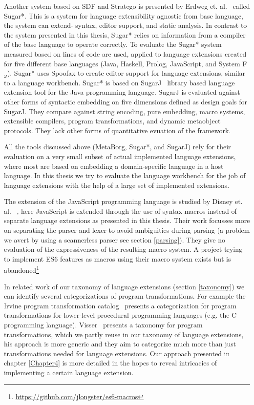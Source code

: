 Another system based on SDF and Stratego is presented by Erdweg et. al.~\cite{Erdweg} called Sugar*. This is a system for language extensibility agnostic from base language, the system can extend- syntax, editor support, and static analysis. In contrast to the system presented in this thesis, Sugar* relies on information from a compiler of the base language to operate correctly. To evaluate the Sugar* system measured based on lines of code are used, applied to language extensions created for five different base languages (Java, Haskell, Prolog, JavaScript, and System F$_{\omega}$). Sugar* uses Spoofax to create editor support for language extensions, similar to a language workbench. Sugar* is based on SugarJ~\cite{Erdweg2011} library based language extension tool for the Java programming language. SugarJ is evaluated against other forms of syntactic embedding on five dimensions defined as design goals for SugarJ. They compare against string encoding, pure embedding, macro systems, extensible compilers, program transformations, and dynamic metaobject protocols. They lack other forms of quantitative evuation of the framework.

All the tools discussed above (MetaBorg, Sugar*, and SugarJ) rely for their evaluation on a very small subset of actual implemented language extensions, where most are based on embedding a domain-specific language in a host language. In this thesis we try to evaluate the language workbench for the job of language extensions with the help of a large set of implemented extensions.  

The extension of the JavaScript programming language is studied by Disney et. al. ~\cite{Disney2014}, here JavaScript is extended through the use of syntax macros instead of separate language extensions as presented in this thesis. Their work focusses more on separating the parser and lexer to avoid ambiguities during parsing (a problem we avert by using a scannerless parser see section \ref{parsing}). They give no evaluation of the expressiveness of the resulting macro system. A project trying to implement ES6 features as macros using their macro system exists but is abandoned\footnote{\url{https://github.com/jlongster/es6-macros}}

In related work of our taxonomy of language extensions (section \ref{taxonomy}) we can identify several categorizations of program transformations. For example the Irvine program transformation catalog~\cite{Standish1976a} presents a categorization for program transformations for lower-level procedural programming languages (e.g. the C programming language). Visser~\cite{Visser2001} presents a taxonomy for program transformations, which we partly reuse in our taxonomy of language extensions, his approach is more generic and they aim to categorize much more than just transformations needed for language extensions. Our approach presented in chapter \ref{Chapter4} is more detailed in the hopes to reveal intricacies of implementing a certain language extension.

